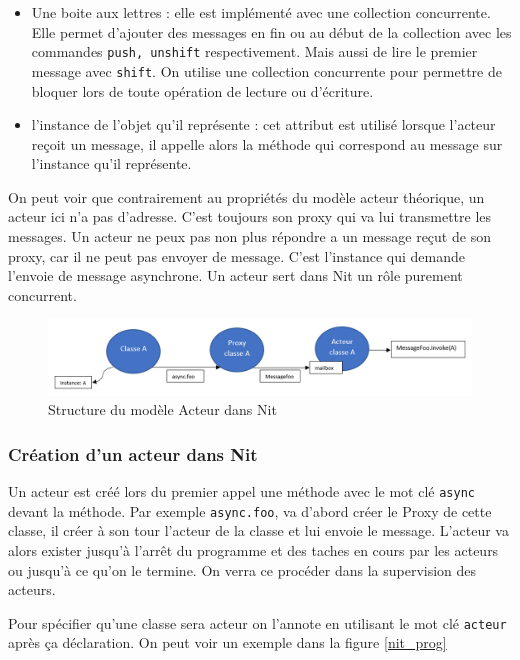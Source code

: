 \documentclass[11pt, a4paper]{article}
\begin{document}
\begin{itemize}
\item Une boite aux lettres : elle est implémenté avec une collection concurrente. Elle permet d'ajouter des messages en fin ou au début de la collection avec les commandes \texttt{push, unshift} respectivement. Mais aussi de lire le premier message avec \texttt{shift}. On utilise une collection concurrente pour permettre de bloquer lors de toute opération de lecture ou d'écriture.
\item l'instance de l'objet qu'il représente : cet attribut est utilisé lorsque l'acteur reçoit un message, il appelle alors la méthode qui correspond au message sur l'instance qu'il représente.
\end{itemize}
On peut voir que contrairement au propriétés du modèle acteur théorique, un acteur ici n'a pas d'adresse. C'est toujours son proxy qui va lui transmettre les messages. Un acteur ne peux pas non plus répondre a un message reçut de son proxy, car il ne peut pas envoyer de message. C'est l'instance qui demande l'envoie de message asynchrone. Un acteur sert dans Nit un rôle purement concurrent.

\begin{figure}
\centering
\includegraphics[scale=0.5]{acteur_nit}
\caption{\label{acteur_nit}Structure du modèle Acteur dans Nit }
\end{figure}

\subsubsection{Création d'un acteur dans Nit}
\par Un acteur est créé lors du premier appel une méthode avec le mot clé \texttt{async} devant la méthode. Par exemple \texttt{async.foo}, va d'abord créer le Proxy de cette classe, il créer à son tour l'acteur de la classe et lui envoie le message. L'acteur va alors exister jusqu'à l'arrêt du programme et des taches en cours par les acteurs ou jusqu'à ce qu'on le termine. On verra ce procéder dans la supervision des acteurs.
\par Pour spécifier qu'une classe sera acteur on l'annote en utilisant le mot clé \texttt{acteur} après ça déclaration. On peut voir un exemple dans la figure \ref{nit_prog}
\end{document}
